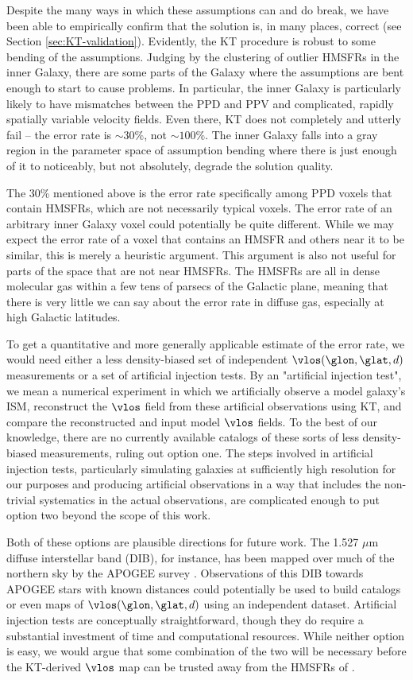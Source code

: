 Despite the many ways in which these assumptions can and do break, we have been able to empirically confirm that the solution is, in many places, correct (see Section \ref{sec:KT-validation}). 
Evidently, the KT procedure is robust to some bending of the assumptions.
Judging by the clustering of outlier HMSFRs in the inner Galaxy, there are some parts of the Galaxy where the assumptions are bent enough to start to cause problems.
In particular, the inner Galaxy is particularly likely to have mismatches between the PPD and PPV and complicated, rapidly spatially variable velocity fields.
Even there, KT does not completely and utterly fail -- the error rate is $\sim 30 \%$, not $\sim 100 \%$.
The inner Galaxy falls into a gray region in the parameter space of assumption bending where there is just enough of it to noticeably, but not absolutely, degrade the solution quality.

The 30\% mentioned above is the error rate specifically among PPD voxels that contain HMSFRs, which are not necessarily typical voxels. 
The error rate of an arbitrary inner Galaxy voxel could potentially be quite different. 
While we may expect the error rate of a voxel that contains an HMSFR and others near it to be similar, this is merely a heuristic argument.
This argument is also not useful for parts of the space that are not near HMSFRs.
The HMSFRs are all in dense molecular gas within a few tens of parsecs of the Galactic plane, meaning that there is very little we can say about the error rate in diffuse gas, especially at high Galactic latitudes. 

To get a quantitative and more generally applicable estimate of the error rate, we would need either a less density-biased set of independent $\vlos(\glon, \glat, d)$ measurements or a set of artificial injection tests. 
By an "artificial injection test", we mean a numerical experiment in which we artificially observe a model galaxy's ISM, reconstruct the $\vlos$ field from these artificial observations using KT, and compare the reconstructed and input model $\vlos$ fields. 
To the best of our knowledge, there are no currently available catalogs of these sorts of less density-biased measurements, ruling out option one.
The steps involved in artificial injection tests, particularly simulating galaxies at sufficiently high resolution for our purposes and producing artificial observations in a way that includes the non-trivial systematics in the actual observations, are complicated enough to put option two beyond the scope of this work.

Both of these options are plausible directions for future work. 
The 1.527 $\mu$m diffuse interstellar band (DIB), for instance, has been mapped over much of the northern sky by the APOGEE survey \citep{2015ApJ...798...35Z}. 
Observations of this DIB towards APOGEE stars with known distances could potentially be used to build catalogs or even maps of $\vlos(\glon, \glat, d)$ using an independent dataset. 
Artificial injection tests are conceptually straightforward, though they do require a substantial investment of time and computational resources.
While neither option is easy, we would argue that some combination of the two will be necessary before the KT-derived $\vlos$ map can be trusted away from the HMSFRs of \Reid.